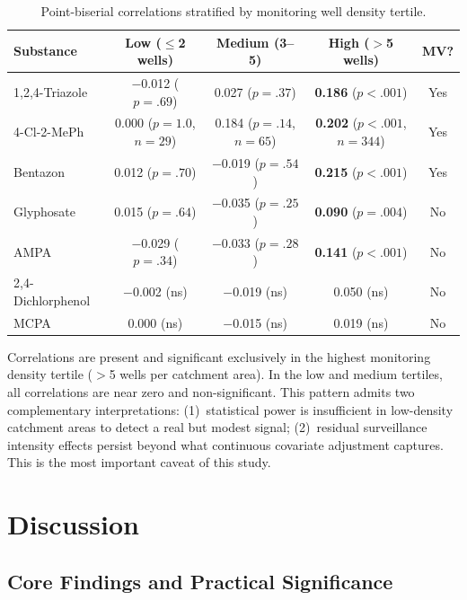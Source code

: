 \documentclass[12pt,a4paper]{article}
\begin{document}
\begin{table}[H]
\centering
\caption{Point-biserial correlations stratified by monitoring well density tertile.}
\label{tab:stratified}
\scriptsize
\begin{tabular}{@{}lcccc@{}}
\toprule
Substance & Low ($\leq$2 wells) & Medium (3--5) & High ($>$5 wells) & MV? \\
\midrule
1,2,4-Triazole & $-$0.012 ($p=.69$) & 0.027 ($p=.37$) & \textbf{0.186} ($p<.001$) & Yes \\
4-Cl-2-MePh & 0.000 ($p=1.0$, $n\!=\!29$) & 0.184 ($p=.14$, $n\!=\!65$) & \textbf{0.202} ($p<.001$, $n\!=\!344$) & Yes \\
Bentazon & 0.012 ($p=.70$) & $-$0.019 ($p=.54$) & \textbf{0.215} ($p<.001$) & Yes \\
Glyphosate & 0.015 ($p=.64$) & $-$0.035 ($p=.25$) & \textbf{0.090} ($p=.004$) & No \\
AMPA & $-$0.029 ($p=.34$) & $-$0.033 ($p=.28$) & \textbf{0.141} ($p<.001$) & No \\
2,4-Dichlorphenol & $-$0.002 (ns) & $-$0.019 (ns) & 0.050 (ns) & No \\
MCPA & 0.000 (ns) & $-$0.015 (ns) & 0.019 (ns) & No \\
\bottomrule
\end{tabular}
\end{table}

Correlations are present and significant exclusively in the highest monitoring density tertile ($>$5 wells per catchment area). In the low and medium tertiles, all correlations are near zero and non-significant. This pattern admits two complementary interpretations: (1)~statistical power is insufficient in low-density catchment areas to detect a real but modest signal; (2)~residual surveillance intensity effects persist beyond what continuous covariate adjustment captures. This is the most important caveat of this study.

\section{Discussion}

\subsection{Core Findings and Practical Significance}
\end{document}
